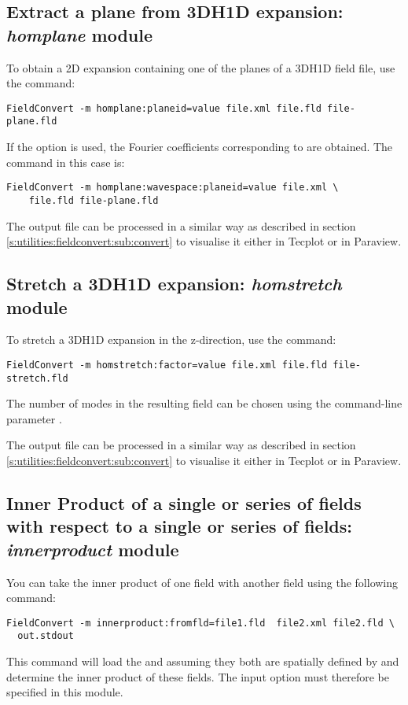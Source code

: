 \subsection{Extract a plane from 3DH1D expansion: \textit{homplane} module}

To obtain a 2D expansion containing one of the planes of a
3DH1D field file, use the command:
\begin{lstlisting}[style=BashInputStyle]
FieldConvert -m homplane:planeid=value file.xml file.fld file-plane.fld
\end{lstlisting}

If the option  is used, the Fourier coefficients
corresponding to  are obtained. The command in this case is:
\begin{lstlisting}[style=BashInputStyle]
FieldConvert -m homplane:wavespace:planeid=value file.xml \
    file.fld file-plane.fld
\end{lstlisting}

The output file  can be processed in a similar
way as described in section \ref{s:utilities:fieldconvert:sub:convert}
to visualise it either in Tecplot or in Paraview.

\subsection{Stretch a 3DH1D expansion: \textit{homstretch} module}

To stretch a 3DH1D expansion in the z-direction, use the command:
\begin{lstlisting}[style=BashInputStyle]
FieldConvert -m homstretch:factor=value file.xml file.fld file-stretch.fld
\end{lstlisting}
The number of modes in the resulting field can be chosen using the command-line
parameter \inltt{output-points-hom-z}.

The output file  can be processed in a similar
way as described in section \ref{s:utilities:fieldconvert:sub:convert}
to visualise it either in Tecplot or in Paraview.


\subsection{Inner Product of a single or series of fields with respect to a single or series of fields: \textit{innerproduct} module}
You can take the inner product of one field with another field using
the following command:
\begin{lstlisting}[style=BashInputStyle]
  FieldConvert -m innerproduct:fromfld=file1.fld  file2.xml file2.fld \
  out.stdout
\end{lstlisting}
This command will load the  and 
assuming they both are spatially defined by  and
determine the inner product of these fields. The input option
\inltt{fromfld} must therefore be specified in this module.

